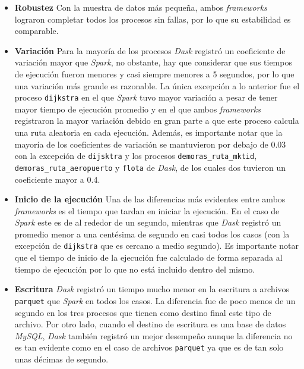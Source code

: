 \begin{itemize}
	
	\item \textbf{Robustez} Con la muestra de datos más pequeña, ambos \textit{frameworks} lograron completar todos los procesos sin fallas, por lo que su estabilidad es comparable.
	
	\item \textbf{Variación} Para la mayoría de los procesos \textit{Dask} registró un coeficiente de variación mayor que \textit{Spark}, no obstante, hay que considerar que sus tiempos de ejecución fueron menores y casi siempre menores a 5 segundos, por lo que una variación más grande es razonable. La única excepción a lo anterior fue el proceso \texttt{dijkstra} en el que \textit{Spark} tuvo mayor variación a pesar de tener mayor tiempo de ejecución promedio y en el que ambos \textit{frameworks} registraron la mayor variación debido en gran parte a que este proceso calcula una ruta aleatoria en cada ejecución. Además, es importante notar que la mayoría de los coeficientes de variación se mantuvieron por debajo de 0.03 con la excepción de \texttt{dijsktra} y los procesos \texttt{demoras\_ruta\_mktid}, \texttt{demoras\_ruta\_aeropuerto} y \texttt{flota} de \textit{Dask}, de los cuales dos tuvieron un coeficiente mayor a 0.4. 
	
	\item \textbf{Inicio de la ejecución} Una de las diferencias más evidentes entre ambos \textit{frameworks} es el tiempo que tardan en iniciar la ejecución. En el caso de \textit{Spark} este es de al rededor de un segundo, mientras que \textit{Dask} registró un promedio menor a una centésima de segundo en casi todos los casos (con la excepción de \texttt{dijkstra} que es cercano a medio segundo). Es importante notar que el tiempo de inicio de la ejecución fue calculado de forma separada al tiempo de ejecución por lo que no está incluido dentro del mismo.
	
	\item \textbf{Escritura} \textit{Dask} registró un tiempo mucho menor en la escritura a archivos \texttt{parquet} que \textit{Spark} en todos los casos. La diferencia fue de poco menos de un segundo en los tres procesos que tienen como destino final este tipo de archivo. Por otro lado, cuando el destino de escritura es una base de datos \textit{MySQL}, \textit{Dask} también registró un mejor desempeño aunque la diferencia no es tan evidente como en el caso de archivos \texttt{parquet} ya que es de tan solo unas décimas de segundo.
	

\end{itemize}
